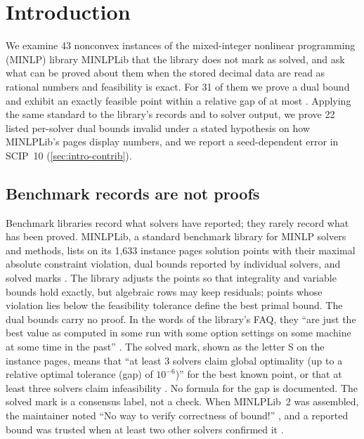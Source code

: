 \section{Introduction}\label{sec:intro}

We examine 43 nonconvex instances of the mixed-integer nonlinear programming (MINLP) library MINLPLib \citep{bussieck2003-minlpliba-collection-of-test-models,vigerske2014-minlplib-2} that the library does not mark as solved, and ask what can be proved about them when the stored decimal data are read as rational numbers and feasibility is exact.
For 31 of them we prove a dual bound and exhibit an exactly feasible point within a relative gap of at most .
Applying the same standard to the library's records and to solver output, we prove 22 listed per-solver dual bounds invalid under a stated hypothesis on how MINLPLib's pages display numbers, and we report a seed-dependent error in SCIP~10 (\cref{sec:intro-contrib}).

\subsection{Benchmark records are not proofs}\label{sec:intro-records}

Benchmark libraries record what solvers have reported; they rarely record what has been proved.
MINLPLib, a standard benchmark library for MINLP solvers and methods, lists on its 1,633 instance pages solution points with their maximal absolute constraint violation, dual bounds reported by individual solvers, and solved marks \citep{vigerske2026-minlplib-documentation-database-snapshot-2026}.
The library adjusts the points so that integrality and variable bounds hold exactly, but algebraic rows may keep residuals; points whose violation lies below the feasibility tolerance define the best primal bound.
The dual bounds carry no proof.
In the words of the library's FAQ, they ``are just the best value as computed in some run with some option settings on some machine at some time in the past'' \citep{vigerske2026-minlplib-a-library-of-mixed}.
The solved mark, shown as the letter S on the instance pages, means that ``at least 3 solvers claim global optimality (up to a relative optimal tolerance (gap) of $10^{-6}$)'' for the best known point, or that at least three solvers claim infeasibility \citep{vigerske2026-minlplib-documentation-database-snapshot-2026}.
No formula for the gap is documented.
The solved mark is a consensus label, not a check.
When MINLPLib~2 was assembled, the maintainer noted ``No way to verify correctness of bound!'' \citep[slide 23, PDF p.~38]{vigerske2014-towards-minlplib-2-0}, and a reported bound was trusted when at least two other solvers confirmed it \citep[p.~140]{vigerske2014-minlplib-2}.

